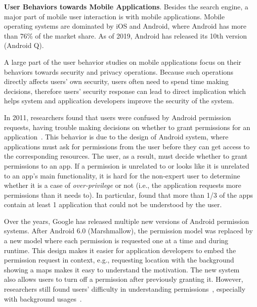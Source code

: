 \textbf{User Behaviors towards Mobile Applications}. Besides the search engine, a major part of mobile user interaction is with mobile applications. Mobile operating systems are dominated by iOS and Android, where Android has more than 76\% of the market share. As of 2019, Android has released its 10th version (Android Q). 

A large part of the user behavior studies on mobile applications focus on their behaviors towards security and privacy operations. Because such operations directly affects users' own security, users often need to spend time making decisions, therefore users' security response can lead to direct implication which helps system and application developers improve the security of the system. 

In 2011, researchers found that users were confused by Android permission requests, having trouble making decisions on whether to grant permissions for an application~\cite{conf/soups/FeltHEHCW12}. This behavior is due to the design of Android system, where applications must ask for permissions from the user before they can get access to the corresponding resources. The user, as a result, must decide whether to grant permissions to an app. If a permission is unrelated to or looks like it is unrelated to an app's main functionality, it is hard for the non-expert user to determine whether it is a case of \emph{over-privilege} or not (i.e., the application requests more permissions than it needs to). In particular, \cite{conf/soups/FeltHEHCW12} found that more than 1/3 of the apps contain at least 1 application that could not be understood by the user. 

Over the years, Google has released multiple new versions of Android permission systems. After Android 6.0 (Marshmallow), the permission model was replaced by a new model where each permission is requested one at a time and during runtime. This design makes it easier for application developers to embed the permission request in context, e.g., requesting location with the background showing a maps makes it easy to understand the motivation. The new system also allows users to turn off a permission after previously granting it. However, researchers still found users' difficulty in understanding permissions~\cite{}, especially with background usages~\cite{background}. 
